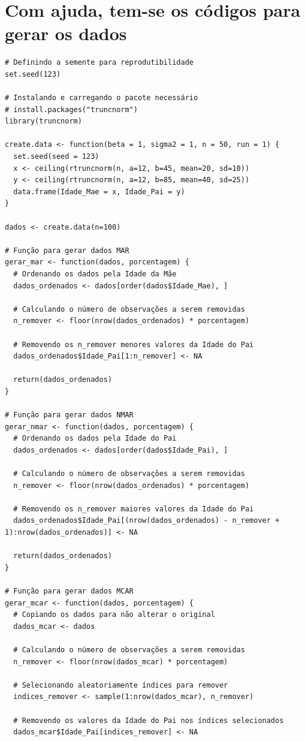\documentclass[11pt]{article}
\begin{document}
\section*{Com ajuda, tem-se os códigos para gerar os dados}
\begin{verbatim}
# Definindo a semente para reprodutibilidade
set.seed(123)

# Instalando e carregando o pacote necessário
# install.packages("truncnorm")
library(truncnorm)

create.data <- function(beta = 1, sigma2 = 1, n = 50, run = 1) {
  set.seed(seed = 123)
  x <- ceiling(rtruncnorm(n, a=12, b=45, mean=20, sd=10))
  y <- ceiling(rtruncnorm(n, a=12, b=85, mean=40, sd=25))
  data.frame(Idade_Mae = x, Idade_Pai = y)
}

dados <- create.data(n=100)

# Função para gerar dados MAR
gerar_mar <- function(dados, porcentagem) {
  # Ordenando os dados pela Idade da Mãe
  dados_ordenados <- dados[order(dados$Idade_Mae), ]
  
  # Calculando o número de observações a serem removidas
  n_remover <- floor(nrow(dados_ordenados) * porcentagem)
  
  # Removendo os n_remover menores valores da Idade do Pai
  dados_ordenados$Idade_Pai[1:n_remover] <- NA
  
  return(dados_ordenados)
}

# Função para gerar dados NMAR
gerar_nmar <- function(dados, porcentagem) {
  # Ordenando os dados pela Idade do Pai
  dados_ordenados <- dados[order(dados$Idade_Pai), ]
  
  # Calculando o número de observações a serem removidas
  n_remover <- floor(nrow(dados_ordenados) * porcentagem)
  
  # Removendo os n_remover maiores valores da Idade do Pai
  dados_ordenados$Idade_Pai[(nrow(dados_ordenados) - n_remover + 1):nrow(dados_ordenados)] <- NA
  
  return(dados_ordenados)
}

# Função para gerar dados MCAR
gerar_mcar <- function(dados, porcentagem) {
  # Copiando os dados para não alterar o original
  dados_mcar <- dados
  
  # Calculando o número de observações a serem removidas
  n_remover <- floor(nrow(dados_mcar) * porcentagem)
  
  # Selecionando aleatoriamente índices para remover
  indices_remover <- sample(1:nrow(dados_mcar), n_remover)
  
  # Removendo os valores da Idade do Pai nos índices selecionados
  dados_mcar$Idade_Pai[indices_remover] <- NA
  

\end{verbatim}
\end{document}
